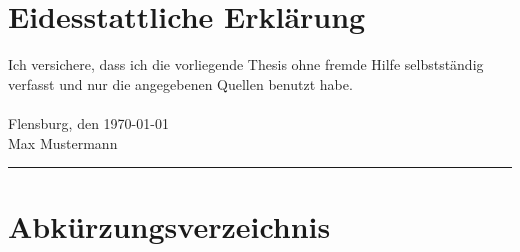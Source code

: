 

\newcommand*{\mytitle}{\LaTeX-Vorlage für Berichte, Bachelor- oder Masterarbeiten} %
\newcommand*{\myinstitute}{Hochschue Flensburg} %
\newcommand*{\myfaculty}{Fachbereich 1: \textit{Musterstudiengang}} %
\newcommand*{\myauthor}{Max Mustermann} %
\newcommand*{\myreporttype}{Abschlussarbeit} %
\newcommand*{\mygraduation}{Master of Engineering} %
\newcommand*{\firstexaminer}{Prof. Dr.-Ing. Max Mustermann} %
\newcommand*{\secondexaminer}{Prof. Dr.-Ing. Maxima Musterfrau} %
\newcommand*{\mydate}{\today} %




	
\pagestyle{empty}

\newpage 					%
\thispagestyle{empty}
\quad 
\newpage
{}
 
\cleardoubleoddpage


\chapter*{Eidesstattliche Erklärung}
Ich versichere, dass ich die vorliegende Thesis ohne fremde Hilfe selbstständig verfasst und nur die angegebenen Quellen benutzt habe. \\~\\
Flensburg, den \today\\[.6cm]
Max Mustermann\\
\rule[0.5em]{20em}{0.5pt}



\tableofcontents			%
\listoffigures				%
\listoftables				%
\chapter*{Abkürzungsverzeichnis}
	\begin{acronym}[4GDH]	%
	\end{acronym}

\pagestyle{fancy}







\newpage
\lhead{}
\rhead{\leftmark}


\appendix





